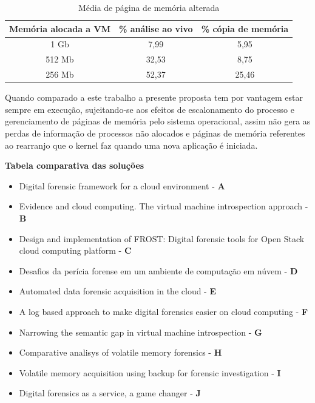 \documentclass[
	12pt,				%
	openright,			%
	oneside,			%
	a4paper,			%
	english,			%
	french,				%
	spanish,			%
	brazil,				%
	]{abntex2}
\begin{document}
\begin{itemize}
\begin{table}[h!]
\centering
\caption{Média de página de memória alterada}
\label{my-label}
\begin{tabular}{c|c|c}
\hline
\textbf{Memória alocada a VM} & \textbf{\% análise ao vivo} 			  & \textbf{\% cópia de memória} \\ \hline
1 Gb                          & 7,99                                              & 5,95                         \\ \hline
512 Mb                        & 32,53                                             & 8,75                         \\ \hline
256 Mb                        & 52,37                                             & 25,46                                                         
\end{tabular}
\end{table}

Quando comparado a este trabalho a presente proposta tem por vantagem estar sempre em execução, sujeitando-se aos efeitos de escalonamento do processo e 
gerenciamento de páginas de memória pelo sistema operacional, assim não gera as perdas de informação de processos não alocados e páginas de memória referentes ao 
rearranjo que o kernel faz quando uma nova aplicação é iniciada.

\end{itemize}
 
\textbf{Tabela comparativa das soluções}
 
\begin{itemize}
 \item Digital forensic framework for a cloud environment - \textbf{A}
 \item Evidence and cloud computing. The virtual machine introspection approach - \textbf{B}
 \item Design and implementation of FROST: Digital forensic tools for Open Stack cloud computing platform - \textbf{C}
 \item Desafios da perícia forense em um ambiente de computação em núvem - \textbf{D}
 \item Automated data forensic acquisition in the cloud - \textbf{E}
 \item A log based approach to make digital forensics easier on cloud computing - \textbf{F}
 \item Narrowing the semantic gap in virtual machine introspection - \textbf{G}
 \item Comparative analisys of volatile memory forensics - \textbf{H}
 \item Volatile memory acquisition using backup for forensic investigation - \textbf{I}
 \item Digital forensics as a service, a game changer - \textbf{J}
\end{itemize}
\end{document}
